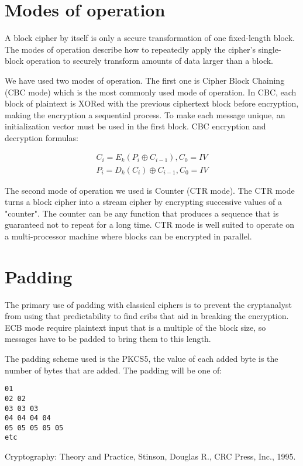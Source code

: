 \documentclass{article}
\newcommand*\xor{\mathbin{\oplus}}
\begin{document}
\section{Modes of operation}
A block cipher by itself is only a secure transformation of one fixed-length block. The modes of operation describe how to repeatedly apply the cipher's single-block operation to securely transform amounts of data larger than a block.

We have used two modes of operation. The first one is Cipher Block Chaining (CBC mode) which is the most commonly used mode of operation. In CBC, each block of plaintext is XORed with the previous ciphertext block before encryption, making the encryption a sequential process. To make each message unique, an initialization vector must be used in the first block. CBC encryption and decryption formulas:

\begin{eqnarray}
\label{eq:cbc}
C_i = E_k(P_i \xor C_{i-1}), C_0 = IV \\
P_i = D_k(C_i) \xor C_{i-1}, C_0 = IV
\end{eqnarray}

The second mode of operation we used is Counter (CTR mode). The CTR mode turns a block cipher into a stream cipher by encrypting successive values of a "counter". The counter can be any function that produces a sequence that is guaranteed not to repeat for a long time. CTR mode is well suited to operate on a multi-processor machine where blocks can be encrypted in parallel.

\section{Padding}
The primary use of padding with classical ciphers is to prevent the cryptanalyst from using that predictability to find cribs that aid in breaking the encryption. ECB mode require plaintext input that is a multiple of the block size, so messages have to be padded to bring them to this length.

The padding scheme used is the PKCS5, the value of each added byte is the number of bytes that are added. The padding will be one of:

\begin{verbatim}
01
02 02
03 03 03
04 04 04 04
05 05 05 05 05
etc
\end{verbatim}


\begin{thebibliography}{1}

 Cryptography: Theory and Practice, Stinson, Douglas R., CRC Press, Inc., 1995.

\end{thebibliography}
\end{document}
